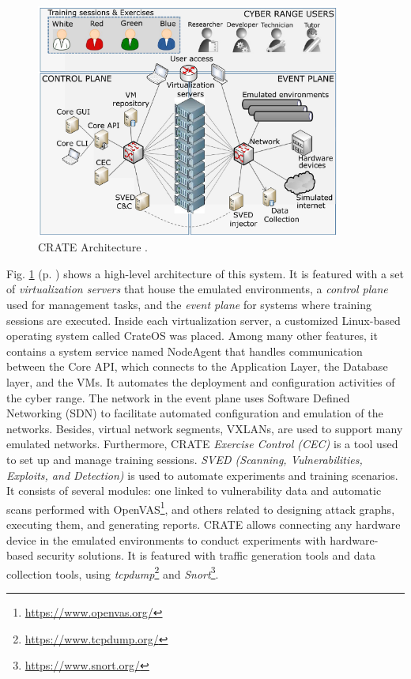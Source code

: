 \begin{figure}[ht]
    \includegraphics[width=10cm]{figures/crate_architecture.png}
    \caption{CRATE Architecture \cite{crate_ref}.}
    \label{fig:crate_architecture}
\end{figure}

Fig. \ref{fig:crate_architecture} (p. \pageref{fig:crate_architecture}) shows a high-level architecture of this system. It is featured with a set of \textit{virtualization servers} that house the emulated environments, a \textit{control plane} used for management tasks, and the \textit{event plane} for systems where training sessions are executed. Inside each virtualization server, a customized Linux-based operating system called CrateOS was placed. Among many other features, it contains a system service named NodeAgent that handles communication between the Core API, which connects to the Application Layer, the Database layer, and the VMs. It automates the deployment and configuration activities of the cyber range. The network in the event plane uses Software Defined Networking (SDN) to facilitate automated configuration and emulation of the networks. Besides, virtual network segments, VXLANs, are used to support many emulated networks. Furthermore, CRATE \textit{Exercise Control (CEC)} is a tool used to set up and manage training sessions. \textit{SVED (Scanning, Vulnerabilities, Exploits, and Detection)} is used to automate experiments and training scenarios. It consists of several modules: one linked to vulnerability data and automatic scans performed with OpenVAS\footnote{\url{https://www.openvas.org/}}, and others related to designing attack graphs, executing them, and generating reports. CRATE allows connecting any hardware device in the emulated environments to conduct experiments with hardware-based security solutions. It is featured with traffic generation tools and data collection tools, using \textit{tcpdump}\footnote{\url{https://www.tcpdump.org/}} and \textit{Snort}\footnote{\url{https://www.snort.org/}}.

